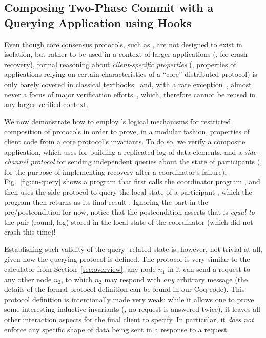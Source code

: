 \subsection{Composing Two-Phase Commit with a Querying Application
  using Hooks}
\label{sec:composing-two-phase}


Even though core consensus protocols, such as , are not
designed to exist in isolation, but rather to be used in a context of
larger applications (\eg, for crash recovery), formal reasoning about
\emph{client-specific properties} (\ie, properties of applications
relying on certain characteristics of a ``core'' distributed protocol) is only
barely covered in classical textbooks~\cite{Weikum-Vossen:TIS02} and,
with a rare exception~\cite{Lesani-al:POPL16}, almost never a focus of
major verification
efforts~\cite{Woos-al:CPP16,Hawblitzel-al:SOSP15,rahli:eventml-avocs},
which, therefore cannot be reused in any larger verified context.

We now demonstrate how to employ \disel's logical mechanisms for
restricted composition of protocols in order to prove, in a modular
fashion, properties of client code from a core protocol's invariants.
%
To do so, we verify a composite application, which uses  for
building a replicated log of data elements, and a \emph{side-channel
  protocol} for sending independent queries about the state of
 participants (\eg, for the purpose of implementing recovery
after a coordinator's failure).
%
Fig.~\ref{fig:cn-query} shows a program that first calls the
coordinator program , and then uses the side
protocol to query the local state of a participant , which
the program then returns as its final result .  Ignoring the
 part in the pre/postcondition for now, notice that
the postcondition asserts that  is \emph{equal to} the pair
 (round, log) stored in the local state of the coordinator
(which did not crash this time)!

Establishing such validity of the query \wrt {}-related state
is, however, not trivial at all, given how the querying protocol is
defined. The protocol  is very similar to the calculator
from Section~\ref{sec:overview}: any node $n_1$ in it can send a
request to any other node $n_2$, to which $n_2$ may respond with
\emph{any} arbitrary message (the details of the formal protocol
definition can be found in our Coq code). This protocol definition is
intentionally made very weak: while it allows one to prove some
interesting inductive invariants (\eg, no request is answered twice),
it leaves all other interaction aspects for the final client to
specify. In particular, it \emph{does not} enforce any specific shape
of data being sent in a response to a request.

